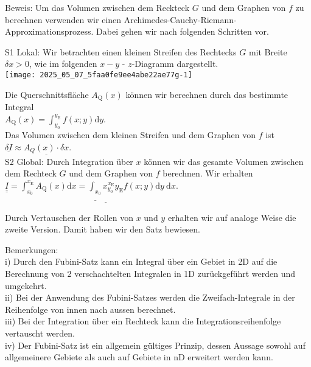 \documentclass[10pt]{article}
\begin{document}
Beweis: Um das Volumen zwischen dem Reckteck $G$ und dem Graphen von $f$ zu berechnen verwenden wir einen Archimedes-Cauchy-Riemann-Approximationsprozess. Dabei gehen wir nach folgenden Schritten vor.

S1 Lokal: Wir betrachten einen kleinen Streifen des Rechtecks $G$ mit Breite $\delta x>0$, wie im folgenden $x-y$ - $z$-Diagramm dargestellt.\\
\texttt{[image: 2025\_05\_07\_5faa0fe9ee4abe22ae77g-1]}

Die Querschnittsfläche $A_{\mathrm{Q}}(x)$ können wir berechnen durch das bestimmte Integral\\
$A_{\mathrm{Q}}(x)=\int_{y_{0}}^{y_{\mathrm{E}}} f(x ; y) \mathrm{d} y$.\\
Das Volumen zwischen dem kleinen Streifen und dem Graphen von $f$ ist\\
$\underline{\delta I} \approx \underline{A_{Q}(x) \cdot \delta x}$.\\
S2 Global: Durch Integration über $x$ können wir das gesamte Volumen zwischen dem Rechteck $G$ und dem Graphen von $f$ berechnen. Wir erhalten\\
$\underline{\underline{I}}=\int_{x_{0}}^{x_{\mathrm{E}}} A_{\mathrm{Q}}(x) \mathrm{d} x=\underline{\underline{\int_{x_{0}}} x_{y_{0}}^{x_{\mathrm{E}}} y_{\mathrm{E}}} f(x ; y) \mathrm{d} y \mathrm{~d} x$.

Durch Vertauschen der Rollen von $x$ und $y$ erhalten wir auf analoge Weise die zweite Version. Damit haben wir den Satz bewiesen.

Bemerkungen:\\
i) Durch den Fubini-Satz kann ein Integral über ein Gebiet in 2D auf die Berechnung von 2 verschachtelten Integralen in 1D zurückgeführt werden und umgekehrt.\\
ii) Bei der Anwendung des Fubini-Satzes werden die Zweifach-Integrale in der Reihenfolge von innen nach aussen berechnet.\\
iii) Bei der Integration über ein Rechteck kann die Integrationsreihenfolge vertauscht werden.\\
iv) Der Fubini-Satz ist ein allgemein gültiges Prinzip, dessen Aussage sowohl auf allgemeinere Gebiete als auch auf Gebiete in nD erweitert werden kann.
\end{document}
